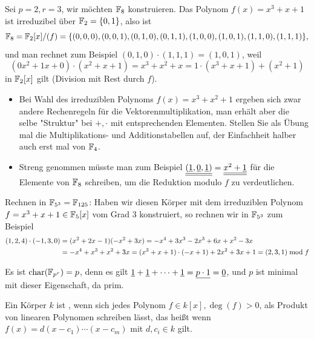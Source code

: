 \begin{bsp}
	Sei $p = 2, r=3$, wir möchten $\mathbb{F}_8$ konstruieren. Das Polynom $f(x) = x^3 + x + 1$ ist irreduzibel über $\mathbb{F}_2 = \{0,1\}$, also ist 
	\[ \mathbb{F}_8 = \mathbb{F}_2[x]/(f) = \{ (0,0,0), (0,0,1), (0,1,0), (0,1,1), (1,0,0), (1,0,1), (1,1,0), (1,1,1)\}, \]
	und man rechnet zum Beispiel $(0,1,0) \cdot (1,1,1) = (1,0,1)$, weil
	\[ (0x^2 + 1x + 0) \cdot (x^2 + x + 1) = x^3 + x^2 + x = 1 \cdot (x^3 + x + 1) + (x^2 + 1) \]
	in $\mathbb{F}_2[x]$ gilt (Division mit Rest durch $f$). 
	\begin{itemize}
	\item Bei Wahl des irreduziblen Polynoms $f(x) = x^3 + x^2 + 1$ ergeben sich zwar andere Rechenregeln für die Vektorenmultiplikation, man erhält aber die selbe "Struktur" bei $+,\cdot$ mit entsprechenden Elementen. 
	Stellen Sie als Übung mal die Multiplikations- und Additionstabellen auf, der Einfachheit halber auch erst mal von $\mathbb{F}_4$.
	\item Streng genommen müsste man zum Beispiel $\underline{\underline{(\underline{1}, \underline{0}, \underline{1})}} = \underline{\underline{x^2 + \underline{1}}}$ für die Elemente von $\mathbb{F}_8$ schreiben, um die Reduktion modulo $f$ zu verdeutlichen.
	\end{itemize}
\end{bsp}

\begin{bsp}
	Rechnen in $\mathbb{F}_{5^3} = \mathbb{F}_{125}$: Haben wir diesen Körper mit dem irreduziblen Polynom $f = x^3 + x + 1 \in \mathbb{F}_5[x]$ vom Grad $3$ konstruiert, so rechnen wir in $\mathbb{F}_{5^3}$ zum Beispiel
	\begin{equation}
	\begin{aligned}
		(1,2,4) \cdot (-1,3,0) &= (x^2 + 2x - 1)(-x^2 + 3x) = -x^4 + 3x^3 - 2x^3 + 6x + x^2 -3x \\
		&= -x^4 + x^3 + x^2 + 3x = (x^3+x+1) \cdot (-x+1) + 2x^2+3x+1 = (2,3,1) \bmod f
	\end{aligned}
	\end{equation}
\end{bsp}

\begin{bem}
	Es ist $\operatorname{char}(\mathbb{F}_{p^r}) = p$, denn es gilt $\underline{1} + \underline{1} + \dots + \underline{1} = \underline{p \cdot 1} = \underline{0}$, und $p$ ist minimal mit dieser Eigenschaft, da prim.
\end{bem}

\begin{defn}
	Ein Körper $k$ ist , wenn sich jedes Polynom $f \in k[x], \deg(f) > 0$, als Produkt von linearen Polynomen schreiben lässt, das heißt wenn $f(x) = d(x-c_1) \cdots (x-c_m)$ mit $d,c_i \in k$ gilt.
\end{defn}


